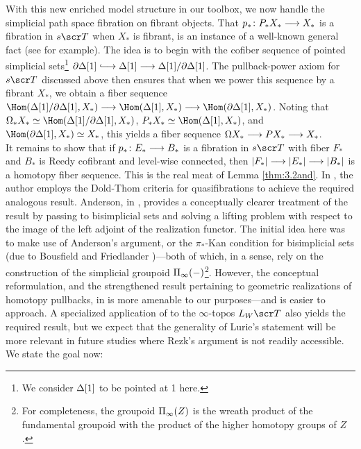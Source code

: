 \documentclass{amsart}
\theoremstyle{definition}
\begin{document}
With this new enriched model structure in our toolbox, we now handle the simplicial path space fibration on fibrant objects. That $p_* \colon P_*X_* \longrightarrow X_*$ is a fibration in $s\sT$ when $X_*$ is fibrant, is an instance of a well-known general fact (see \cite[Lemma 7.5]{goerssjardine} for example). The idea is to begin with the cofiber sequence of pointed simplicial sets\footnote{We consider $\Delta[1]$ to be pointed at 1 here.} $\partial \DE[1] \monoto \DE[1] \rtarr \DE[1]/\partial \DE[1]$. The pullback-power axiom for $s\sT$ discussed above then ensures that when we power this sequence by a fibrant $X_*$, we obtain a fiber sequence $\Hom(\DE[1]/\partial \DE[1], X_*) \rtarr \Hom (\DE[1],X_*)\rtarr \Hom(\partial\DE[1],X_*)$. 
Noting that $\OM_* X_* \simeq \Hom(\DE[1]/\partial \DE[1],X_*)$, $P_*X_* \simeq \Hom(\DE[1],X_*)$, and $\Hom(\partial \DE[1],X_*) \simeq X_*$, this yields a fiber sequence $\Omega X_* \longrightarrow PX_* \longrightarrow X_*$.\\

It remains to show that if $p_* \colon E_{*} \longrightarrow B_{*}$ is a fibration in $s\sT$ with fiber $F_*$ and $B_*$ is Reedy cofibrant and level-wise connected, then $|F_*| \longrightarrow |E_*| \longrightarrow |B_*|$ is a homotopy fiber sequence. This is the real meat of Lemma \ref{thm:3.2and}. In \cite{May72}, the author employs the Dold-Thom criteria for quasifibrations to achieve the required analogous result. 
Anderson, in \cite{anderson78fib}, provides a conceptually clearer treatment of the result by passing to bisimplicial sets and solving a lifting problem with respect to the image of the left adjoint of the realization functor.
The initial idea here was to make use of Anderson's argument, or the $\pi_*$-Kan condition for bisimplicial sets (due to Bousfield and Friedlander \cite{BF1978})---both of which, in a sense, rely on the construction of the simplicial groupoid $\Pi_{\infty}(-)$\footnote{For completeness, the groupoid $\Pi_{\infty} (Z)$ is the wreath product of the fundamental groupoid with the product of the higher homotopy groups of $Z$.}. However, the conceptual reformulation, and the strengthened result pertaining to geometric realizations of homotopy pullbacks, in \cite{Rezk14} is more amenable to our purposes---and is easier to approach. 
A specialized application of \cite[Proposition 5.5.6.17]{Lurie2017} to the $\infty$-topos $L_{W}\sT$ also yields the required result, but we expect that the generality of Lurie's statement will be more relevant in future studies where Rezk's argument is not readily accessible. We state the goal now:
\end{document}
